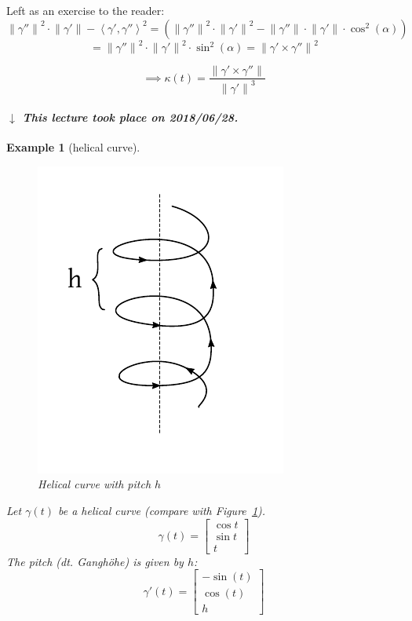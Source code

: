 \documentclass{article}
\newtheorem{example}{Example}  \numberwithin{example}{section}
\newcommand{\angel}[1]{\left\langle#1\right\rangle}
\newcommand{\norm}[1]{\left\|#1\right\|}
\newcommand{\dateref}[1]{%
  \begin{mdframed}[backgroundcolor=gray!10,innerbottommargin=0pt,innertopmargin=0pt]
    \paragraph{\textit{$\downarrow$ This lecture took place on #1.}}%
  \end{mdframed}%
}
\begin{document}
Left as an exercise to the reader:
\[ \norm{\gamma''}^2 \cdot \norm{\gamma'} - \angel{\gamma', \gamma''}^2 = \left(\norm{\gamma''}^2 \cdot \norm{\gamma'}^2 - \norm{\gamma''} \cdot \norm{\gamma'} \cdot \cos^2(\alpha)\right) \]
\[ = \norm{\gamma''}^2 \cdot \norm{\gamma'}^2 \cdot \sin^2(\alpha) = \norm{\gamma' \times \gamma''}^2 \]
\begin{mdframed}
  \[ \implies \kappa(t) = \frac{\norm{\gamma' \times \gamma''}}{\norm{\gamma'}^3} \]
\end{mdframed}

\dateref{2018/06/28}

\begin{example}[helical curve]
  \begin{figure}[t]
    \begin{center}
      \includegraphics{img/55_helical_curve.pdf}
      \caption{Helical curve with pitch $h$}
      \label{img:helical}
    \end{center}
  \end{figure}
  Let $\gamma(t)$ be a helical curve (compare with Figure~\ref{img:helical}).
  \[ \gamma(t) = \begin{bmatrix} \cos{t} \\ \sin{t} \\ t \end{bmatrix} \]
  The pitch (dt. \foreignlanguage{german}{Gangh\"ohe}) is given by $h$:
  \[ \gamma'(t) = \begin{bmatrix} -\sin(t) \\ \cos(t) \\ h \end{bmatrix} \]

\end{example}
\end{document}
